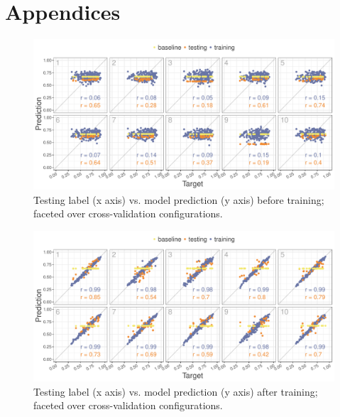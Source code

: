 \documentclass[11pt,a4paper]{article}
\newcommand{\ek}[1]{\textcolor{Orange}{[ek: #1]}}
\begin{document}







\onecolumn
\section{Appendices}
\label{sec:appendix}

\begin{figure}[!htb]
	\includegraphics[width=\linewidth]{graphs/all-pred-target-epoch1.pdf}
	\caption{Testing label (x axis) vs. model prediction (y axis) before training; faceted over cross-validation configurations.}
	\label{fig:app-corr-pretraining}
\end{figure}

\begin{figure}[!htb]
	\includegraphics[width=\linewidth]{graphs/all-pred-target-epoch30.pdf}
	\caption{Testing label (x axis) vs. model prediction (y axis) after training; faceted over cross-validation configurations.}
	\label{fig:app-corr-posttraining}
\end{figure}
\end{document}
